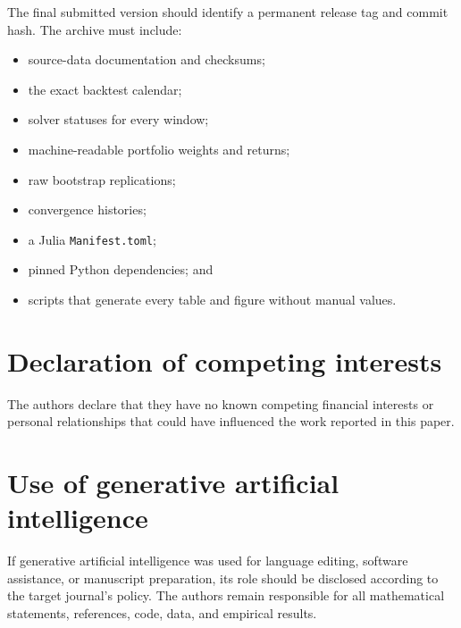 \documentclass[11pt,a4paper]{article}
\theoremstyle{definition}
\theoremstyle{remark}
\begin{document}
The final submitted version should identify a permanent release tag and commit
hash. The archive must include:

\begin{itemize}
    \item source-data documentation and checksums;
    \item the exact backtest calendar;
    \item solver statuses for every window;
    \item machine-readable portfolio weights and returns;
    \item raw bootstrap replications;
    \item convergence histories;
    \item a Julia \texttt{Manifest.toml};
    \item pinned Python dependencies; and
    \item scripts that generate every table and figure without manual values.
\end{itemize}

\section*{Declaration of competing interests}

The authors declare that they have no known competing financial interests or
personal relationships that could have influenced the work reported in this
paper.

\section*{Use of generative artificial intelligence}

If generative artificial intelligence was used for language editing, software
assistance, or manuscript preparation, its role should be disclosed according
to the target journal's policy. The authors remain responsible for all
mathematical statements, references, code, data, and empirical results.



\end{document}
